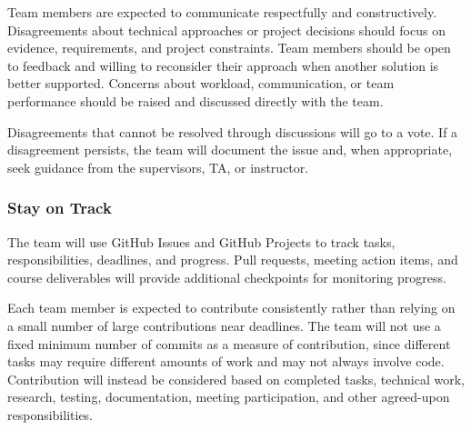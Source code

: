 \documentclass{article}
\begin{document}

Team members are expected to communicate respectfully and constructively. Disagreements about technical approaches or project decisions should focus on evidence, requirements, and project constraints. Team members should be open to feedback and willing to reconsider their approach when another solution is better supported. Concerns about workload, communication, or team performance should be raised and discussed directly with the team.

Disagreements that cannot be resolved through discussions will go to a vote. If a disagreement persists, the team will document the issue and, when appropriate, seek guidance from the supervisors, TA, or instructor.

\subsubsection*{Stay on Track}




The team will use GitHub Issues and GitHub Projects to track tasks, responsibilities, deadlines, and progress. Pull requests, meeting action items, and course deliverables will provide additional checkpoints for monitoring progress.

Each team member is expected to contribute consistently rather than relying on a small number of large contributions near deadlines. The team will not use a fixed minimum number of commits as a measure of contribution, since different tasks may require different amounts of work and may not always involve code. Contribution will instead be considered based on completed tasks, technical work, research, testing, documentation, meeting participation, and other agreed-upon responsibilities.
\end{document}
